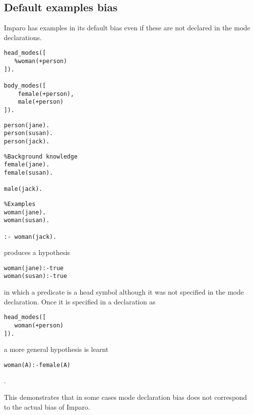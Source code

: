 \subsection{Default examples bias}
Imparo has examples in its default bias even if these are not declared in the mode declarations.

\begin{minipage}[t]{.25\textwidth}
\begin{lstlisting}
head_modes([
   %woman(+person)
]).

body_modes([
    female(+person),
    male(+person)
]).\end{lstlisting}
\end{minipage}
\begin{minipage}[t]{.20\textwidth}
\begin{lstlisting}
person(jane).
person(susan).
person(jack).
\end{lstlisting}
\end{minipage}
\begin{minipage}[t]{.30\textwidth}
\begin{lstlisting}
%Background knowledge
female(jane).
female(susan).

male(jack).
\end{lstlisting}
\end{minipage}
\begin{minipage}[t]{.25\textwidth}
\begin{lstlisting}
%Examples
woman(jane).
woman(susan).

:- woman(jack).
\end{lstlisting}
\end{minipage}


produces a hypothesis 
\begin{lstlisting}
woman(jane):-true
woman(susan):-true
\end{lstlisting}

in which a predicate  is a head symbol although it was not specified in the mode declaration. Once it is specified in a declaration as
\begin{lstlisting}    
head_modes([
   woman(+person)
]).
\end{lstlisting}

a more general hypothesis is learnt

\begin{lstlisting}
woman(A):-female(A)
\end{lstlisting}.

This demonstrates that in some cases mode declaration bias does not correspond to the actual bias of Imparo.

